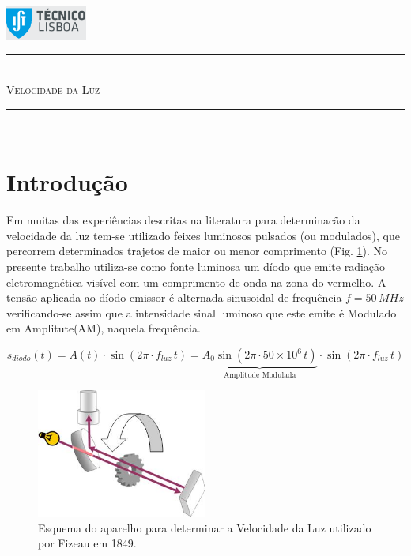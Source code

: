 \documentclass[a4paper,12pt]{article}      %
\author{Prof. Bernardo B. Carvalho}
\date{ Outubro 2012}
\newcommand{\HRule}{\rule{\linewidth}{0.5mm}}
\begin{document}
 

	\includegraphics[width=0.2\textwidth]{../logo-ist}%

	\HRule \\[0.5cm]
	{ \huge \sf  \textsc{Velocidade da Luz} }\\[0.4cm] %
	\HRule \\%


\section{\sf Introdução}
Em muitas das experiências descritas na literatura para
determinacão da velocidade da luz tem-se utilizado feixes luminosos
pulsados (ou modulados), que percorrem determinados trajetos de maior ou menor
comprimento (Fig. \ref{fig:Fizeau}). 
No presente trabalho utiliza-se como fonte luminosa um díodo que
emite radiação eletromagnética visível com um comprimento de onda na
zona do vermelho. A tensão aplicada ao díodo emissor é alternada
sinusoidal de frequência $f=50\,MHz$ verificando-se assim que a intensidade sinal luminoso
que este emite é Modulado em Amplitute(AM), naquela frequência. 

\begin{equation*}
	\label{eq:f_am}
		s_{diodo}(t) = A(t) \cdot \sin ( 2\pi \cdot f_{luz} \, t) = \underbrace{A_0 \sin ( 2\pi \cdot 50\times 10^6 \, t)}_\text{Amplitude Modulada} \cdot \sin ( 2\pi \cdot f_{luz} \, t)
\end{equation*}

\begin{figure}
	[ht!b]  \centering 
	\includegraphics[width=0.5\textwidth]{Fizeau}
	\caption{Esquema do aparelho para determinar a Velocidade da Luz utilizado por Fizeau em 1849. \label{fig:Fizeau}} 
\end{figure}
\end{document}
